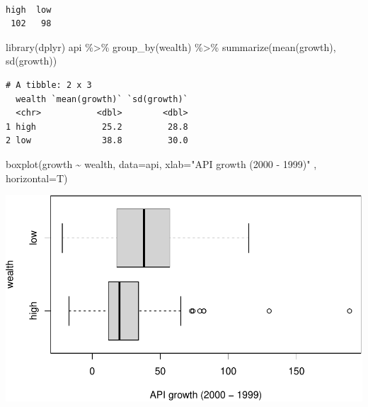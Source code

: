 \documentclass[
]{book}
\newenvironment{Shaded}{\begin{snugshade}}{\end{snugshade}}
\newcommand{\AttributeTok}[1]{\textcolor[rgb]{0.77,0.63,0.00}{#1}}
\newcommand{\DecValTok}[1]{\textcolor[rgb]{0.00,0.00,0.81}{#1}}
\newcommand{\FunctionTok}[1]{\textcolor[rgb]{0.00,0.00,0.00}{#1}}
\newcommand{\NormalTok}[1]{#1}
\newcommand{\OtherTok}[1]{\textcolor[rgb]{0.56,0.35,0.01}{#1}}
\newcommand{\SpecialCharTok}[1]{\textcolor[rgb]{0.00,0.00,0.00}{#1}}
\newcommand{\StringTok}[1]{\textcolor[rgb]{0.31,0.60,0.02}{#1}}
\begin{document}
\begin{Shaded}
\end{Shaded}

\begin{verbatim}

high  low 
 102   98 
\end{verbatim}

\begin{Shaded}
\begin{Highlighting}[]
\FunctionTok{library}\NormalTok{(dplyr)}
\NormalTok{api }\SpecialCharTok{\%\textgreater{}\%} \FunctionTok{group\_by}\NormalTok{(wealth) }\SpecialCharTok{\%\textgreater{}\%} \FunctionTok{summarize}\NormalTok{(}\FunctionTok{mean}\NormalTok{(growth), }\FunctionTok{sd}\NormalTok{(growth))}
\end{Highlighting}
\end{Shaded}

\begin{verbatim}
# A tibble: 2 x 3
  wealth `mean(growth)` `sd(growth)`
  <chr>           <dbl>        <dbl>
1 high             25.2         28.8
2 low              38.8         30.0
\end{verbatim}

\begin{Shaded}
\begin{Highlighting}[]
\FunctionTok{boxplot}\NormalTok{(growth }\SpecialCharTok{\textasciitilde{}}\NormalTok{ wealth, }\AttributeTok{data=}\NormalTok{api, }\AttributeTok{xlab=}\StringTok{"API growth (2000 {-} 1999)"}\NormalTok{ , }\AttributeTok{horizontal=}\NormalTok{T)}
\end{Highlighting}
\end{Shaded}

\includegraphics[width=1\linewidth]{Class_Activity_18_files/figure-latex/unnamed-chunk-9-1}
\end{document}
